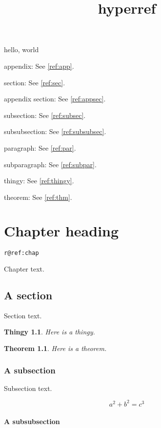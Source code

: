 \documentclass{amsbook}
\title{hyperref}
\newtheorem{x}{Thingy}
\newtheorem{thm}{Theorem}
\begin{document}
hello, world


appendix: See \autoref{ref:app}.

section: See \autoref{ref:sec}.

appendix section: See \autoref{ref:appsec}.

subsection: See \autoref{ref:subsec}.

subsubsection: See \autoref{ref:subsubsec}.

paragraph: See \autoref{ref:par}.

subparagraph: See \autoref{ref:subpar}.

thingy: See \autoref{ref:thingy}.

theorem: See \autoref{ref:thm}.

\newpage

\chapter{Chapter heading}
\label{ref:chap}

{\tt\expandafter\meaning\csname r@ref:chap\endcsname}

Chapter text.

\section{A section}
\label{ref:sec}

Section text.

\begin{x}\label{ref:thingy}
Here is a thingy.
\end{x}

\begin{thm}\label{ref:thm}
Here is a theorem.
\end{thm}

\subsection{A subsection}
\label{ref:subsec}

Subsection text.

\begin{equation}\label{ref:equation}
a^2 + b^2 = c^3
\end{equation}

\subsubsection{A subsubsection}
\label{ref:subsubsec}
\end{document}
